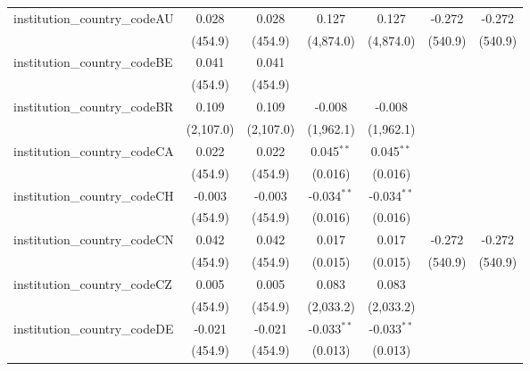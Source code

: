 \begin{tabular}{lcccccc}
   institution\_country\_codeAU          & 0.028         & 0.028         & 0.127          & 0.127          & -0.272    & -0.272\\   
                                         & (454.9)       & (454.9)       & (4,874.0)      & (4,874.0)      & (540.9)   & (540.9)\\   
   institution\_country\_codeBE          & 0.041         & 0.041         &                &                &           &   \\   
                                         & (454.9)       & (454.9)       &                &                &           &   \\   
   institution\_country\_codeBR          & 0.109         & 0.109         & -0.008         & -0.008         &           &   \\   
                                         & (2,107.0)     & (2,107.0)     & (1,962.1)      & (1,962.1)      &           &   \\   
   institution\_country\_codeCA          & 0.022         & 0.022         & 0.045$^{**}$   & 0.045$^{**}$   &           &   \\   
                                         & (454.9)       & (454.9)       & (0.016)        & (0.016)        &           &   \\   
   institution\_country\_codeCH          & -0.003        & -0.003        & -0.034$^{**}$  & -0.034$^{**}$  &           &   \\   
                                         & (454.9)       & (454.9)       & (0.016)        & (0.016)        &           &   \\   
   institution\_country\_codeCN          & 0.042         & 0.042         & 0.017          & 0.017          & -0.272    & -0.272\\   
                                         & (454.9)       & (454.9)       & (0.015)        & (0.015)        & (540.9)   & (540.9)\\   
   institution\_country\_codeCZ          & 0.005         & 0.005         & 0.083          & 0.083          &           &   \\   
                                         & (454.9)       & (454.9)       & (2,033.2)      & (2,033.2)      &           &   \\   
   institution\_country\_codeDE          & -0.021        & -0.021        & -0.033$^{**}$  & -0.033$^{**}$  &           &   \\   
                                         & (454.9)       & (454.9)       & (0.013)        & (0.013)        &           &   \\   

\end{tabular}
